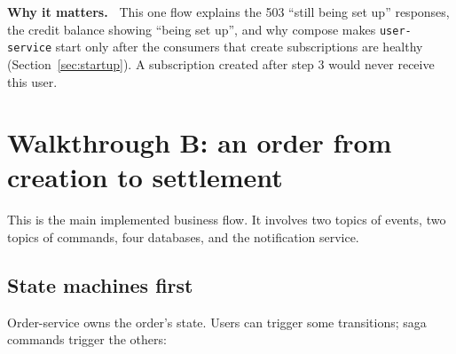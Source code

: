 \documentclass[11pt,a4paper]{article}
\newcommand{\code}[1]{\nolinkurl{#1}}
\newenvironment{why}{%
  \def\FrameCommand{{\color{accent}\vrule width 2.5pt}\hspace{8pt}}%
  \MakeFramed{\advance\hsize-\width\FrameRestore}\noindent\textbf{Why it matters.\ }}%
  {\endMakeFramed}
\begin{document}
\begin{why}
This one flow explains the 503 ``still being set up'' responses, the credit balance
showing ``being set up'', and why compose makes \code{user-service} start only after the
consumers that create subscriptions are healthy (Section~\ref{sec:startup}). A
subscription created after step 3 would never receive this user.
\end{why}

\section{Walkthrough B: an order from creation to settlement}
\label{sec:order}

This is the main implemented business flow. It involves two topics of events, two
topics of commands, four databases, and the notification service.

\subsection{State machines first}

Order-service owns the order's state. Users can trigger some transitions; saga commands
trigger the others:
\end{document}
